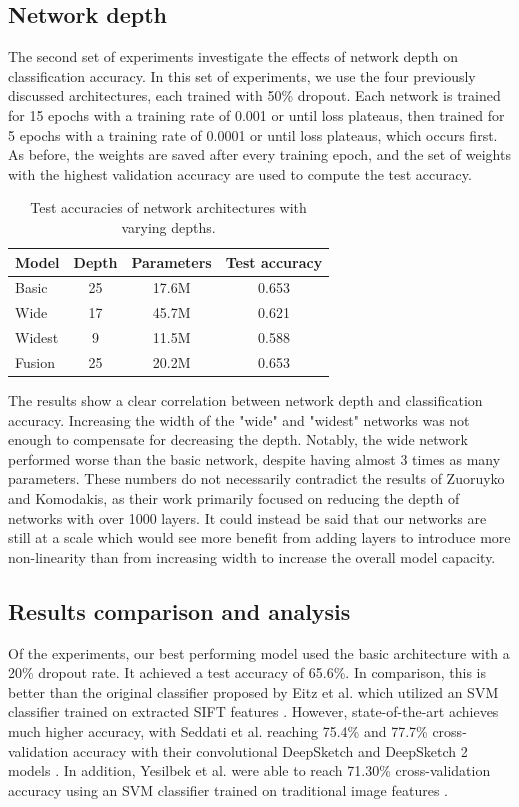 \documentclass[10pt,twocolumn,letterpaper]{article}
\begin{document}
\subsection{Network depth}
The second set of experiments investigate the effects of network depth on classification accuracy. In this set of experiments, we use the four previously discussed architectures, each trained with 50\% dropout. Each network is trained for 15 epochs with a training rate of 0.001 or until loss plateaus, then trained for 5 epochs with a training rate of 0.0001 or until loss plateaus, which occurs first. As before, the weights are saved after every training epoch, and the set of weights with the highest validation accuracy are used to compute the test accuracy.

\begin{table}[h]
	\begin{center} 
	\begin{tabular}{l | c | c | c}
	Model & Depth & Parameters & Test accuracy \\ \hline \hline
	Basic & 25 & 17.6M & 0.653 \\
	Wide & 17 & 45.7M & 0.621 \\
	Widest & 9 & 11.5M & 0.588 \\
	Fusion & 25 & 20.2M & 0.653
	\end{tabular}
	\caption{Test accuracies of network architectures with varying depths.}
	\end{center}
\end{table}

The results show a clear correlation between network depth and classification accuracy. Increasing the width of the "wide" and "widest" networks was not enough to compensate for decreasing the depth. Notably, the wide network performed worse than the basic network, despite having almost 3 times as many parameters. These numbers do not necessarily contradict the results of Zuoruyko and Komodakis, as their work primarily focused on reducing the depth of networks with over 1000 layers. It could instead be said that our networks are still at a scale which would see more benefit from adding layers to introduce more non-linearity than from increasing width to increase the overall model capacity.

\subsection{Results comparison and analysis}
Of the experiments, our best performing model used the basic architecture with a 20\% dropout rate. It achieved a test accuracy of 65.6\%. In comparison, this is better than the original classifier proposed by Eitz et al. which utilized an SVM classifier trained on extracted SIFT features \cite{yesilbek2015svm}. However, state-of-the-art achieves much higher accuracy, with Seddati et al. reaching 75.4\% and 77.7\% cross-validation accuracy with their convolutional DeepSketch and DeepSketch 2 models \cite{seddati2015deepsketch} \cite{seddati2016deepsketch}. In addition, Yesilbek et al. were able to reach 71.30\% cross-validation accuracy using an SVM classifier trained on traditional image features \cite{yesilbek2015svm}.
\end{document}
